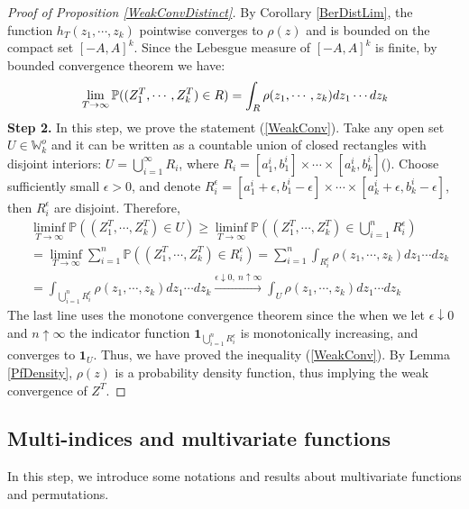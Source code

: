 \begin{proof}[Proof of Proposition \ref{WeakConvDistinct}]
By Corollary \ref{BerDistLim}, the function $h_{T}(z_{1},\cdots,z_{k})$ pointwise converges to $\rho(z)$ and is bounded on the compact set $[-A,A]^{k}$. Since the Lebesgue measure of $[-A,A]^{k}$ is finite, by bounded convergence theorem we have:
\begin{align}{\label{ConvOnRect}}
	\lim_{T\rightarrow\infty}\mathbb{P}((Z_{1}^{T},\cdots,Z_{k}^{T})\in R)=\int_{R}\rho(z_{1},\cdots,z_{k})dz_{1}\cdots dz_{k}
\end{align}
\textbf{Step 2. }In this step, we prove the statement (\ref{WeakConv}). Take any open set $U\in \mathbb{W}_{k}^{o}$ and it can be written as a countable union of closed rectangles with disjoint interiors: $U=\bigcup_{i=1}^{\infty}R_{i}$, where $R_{i}=[a_{1}^{i},b_{1}^{i}]\times\cdots\times[a_{k}^{i},b_{k}^{i}]$(\cite[Theorem 1.4]{Stein}). Choose sufficiently small $\epsilon>0$, and denote $R_{i}^{\epsilon}=[a_{1}^{i}+\epsilon,b_{1}^{i}-\epsilon]\times\cdots\times[a_{k}^{i}+\epsilon,b_{k}^{i}-\epsilon]$, then $R_{i}^{\epsilon}$ are disjoint. Therefore,
\begin{align*}
	&\liminf_{T\rightarrow\infty}\mathbb{P}((Z_{1}^{T},\cdots,Z_{k}^{T})\in U)\geq\liminf_{T\rightarrow\infty}\mathbb{P}((Z_{1}^{T},\cdots,Z_{k}^{T})\in \bigcup_{i=1}^{n}R_{i}^{\epsilon})\\
	&=\liminf_{T\rightarrow\infty}\sum_{i=1}^{n}\mathbb{P}((Z_{1}^{T},\cdots,Z_{k}^{T})\in R_{i}^{\epsilon})=\sum_{i=1}^{n}\int_{R_{i}^{\epsilon}}\rho(z_1,\cdots,z_{k})dz_{1}\cdots dz_{k}\\
	&=\int_{\bigcup_{i=1}^{n}R_{i}^{\epsilon}}\rho(z_1,\cdots,z_{k})dz_{1}\cdots dz_{k} \xrightarrow{\epsilon\downarrow 0,\ n\uparrow\infty} \int_{U}\rho(z_1,\cdots,z_{k})dz_{1}\cdots dz_{k}
\end{align*}
The last line uses the monotone convergence theorem since the when we let $\epsilon\downarrow 0$ and $n\uparrow\infty$ the indicator function $\mathbf{1}_{\bigcup_{i=1}^{n}R_{i}^{\epsilon}}$ is monotonically increasing, and converges to $\mathbf{1}_{U}$. Thus, we have proved the inequality (\ref{WeakConv}). By Lemma \ref{PfDensity}, $\rho(z)$ is a probability density function, thus implying the weak convergence of $Z^{T}$.
\end{proof}

\subsection{Multi-indices and multivariate functions}\label{multivar} In this step, we introduce some notations and results about multivariate functions and permutations.

